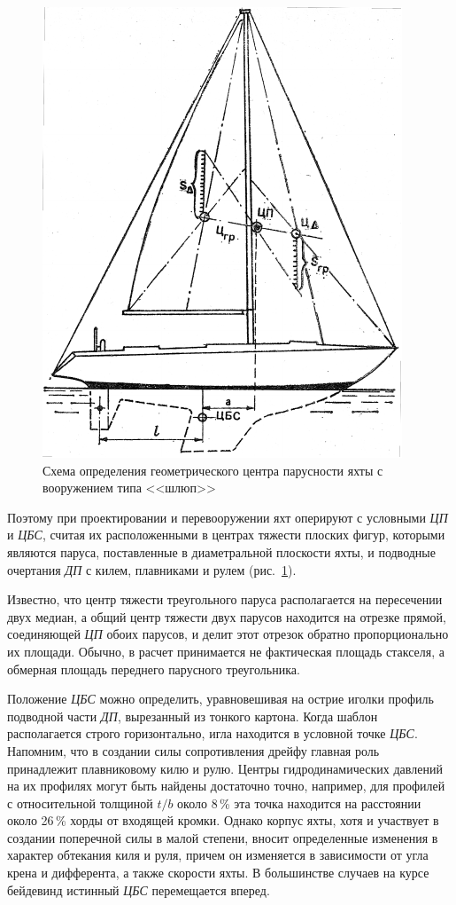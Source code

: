 \documentclass[a4paper, 12pt, twoside, final, book, russian, fittopage, cyremdash]{ncc}
\newcommand{\ris}[1]{\ref{fig:#1}}
\begin{document}
\begin{figure}[htb]
  \centering
  \includegraphics[scale=1.2]{0012P.pdf}
  \caption{Схема определения геометрического центра парусности яхты с вооружением типа <<шлюп>>}
  \label{fig:12}
\end{figure}

Поэтому при проектировании и перевооружении яхт оперируют с условными \textit{ЦП} и \textit{ЦБС}, считая их расположенными в центрах тяжести плоских фигур, которыми являются паруса, поставленные в диаметральной плоскости яхты, и подводные очертания \textit{ДП} с килем, плавниками и рулем (рис.~\ris{12}). 

Известно, что центр тяжести треугольного паруса располагается на пересечении двух медиан, а общий центр тяжести двух парусов находится на отрезке прямой, соединяющей \textit{ЦП} обоих парусов, и делит этот отрезок обратно пропорционально их площади. Обычно, в расчет принимается не фактическая площадь стакселя, а обмерная площадь переднего парусного треугольника. 

Положение \textit{ЦБС} можно определить, уравновешивая на острие иголки профиль подводной части \textit{ДП}, вырезанный из тонкого картона. Когда шаблон располагается строго горизонтально, игла находится в условной точке \textit{ЦБС}. Напомним, что в создании силы сопротивления дрейфу главная роль принадлежит плавниковому килю и рулю. Центры гидродинамических давлений на их профилях могут быть найдены достаточно точно, например, для профилей с относительной толщиной $t/b$ около 8\,\% эта точка находится на расстоянии около 26\,\% хорды от входящей кромки. Однако корпус яхты, хотя и участвует в создании поперечной силы в малой степени, вносит определенные изменения в характер обтекания киля и руля, причем он изменяется в зависимости от угла крена и дифферента, а также скорости яхты. В большинстве случаев на курсе бейдевинд истинный \textit{ЦБС} перемещается вперед. 
\end{document}
